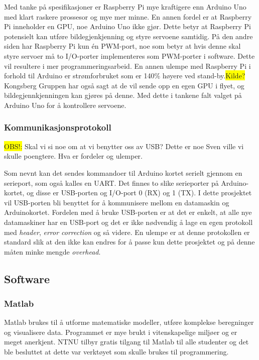Med tanke på spesifikasjoner er Raspberry Pi mye kraftigere enn Arduino Uno med klart raskere prossesor og mye mer minne. En annen fordel er at Raspberry Pi inneholder en GPU, noe Arduino Uno ikke gjør. Dette betyr at Raspberry Pi potensielt kan utføre bildegjenkjenning og styre servoene samtidig. På den andre siden har Raspberry Pi kun én PWM-port, noe som betyr at hvis denne skal styre servoer må to I/O-porter implementeres som PWM-porter i software. Dette vil resultere i mer programmeringsarbeid. En annen ulempe med Raspberry Pi i forhold til Arduino er strømforbruket som er 140\% høyere ved stand-by.\colorbox{yellow}{Kilde?} Kongsberg Gruppen har også sagt at de vil sende opp en egen GPU i flyet, og bildegjennkjenningen kan gjøres på denne. Med dette i tankene falt valget på Arduino Uno for å kontrollere servoene.

\subsubsection{Kommunikasjonsprotokoll}
\colorbox{yellow}{OBS!:} Skal vi si noe om at vi benytter oss av USB? Dette er noe Sven ville vi skulle poengtere. Hva er fordeler og ulemper.

Som nevnt kan det sendes kommandoer til Arduino kortet serielt gjennom en serieport, som også kalles en UART. Det finnes to slike serieporter på Arduino-kortet, og disse er USB-porten og I/O-port 0 (RX) og 1 (TX). I dette prosjektet vil USB-porten bli benyttet for å kommunisere mellom en datamaskin og Arduinokortet. Fordelen med å bruke USB-porten er at det er enkelt, at alle nye datamaskiner har en USB-port og det er ikke nødvendig å lage en egen protokoll med \emph{header}, \emph{error correction} og så videre. En ulempe er at denne protokollen er standard slik at den ikke kan endres for å passe kun dette prosjektet og på denne måten minke mengde \emph{overhead}.

\subsection{Software}

\subsubsection{Matlab}
Matlab brukes til å utforme matematiske modeller, utføre komplekse beregninger og visualisere data. \cite{matlab} Programmet er mye brukt i vitenskapelige miljøer og er meget anerkjent. NTNU tilbyr gratis tilgang til Matlab til alle studenter og det ble besluttet at dette var verktøyet som skulle brukes til programmering. 

